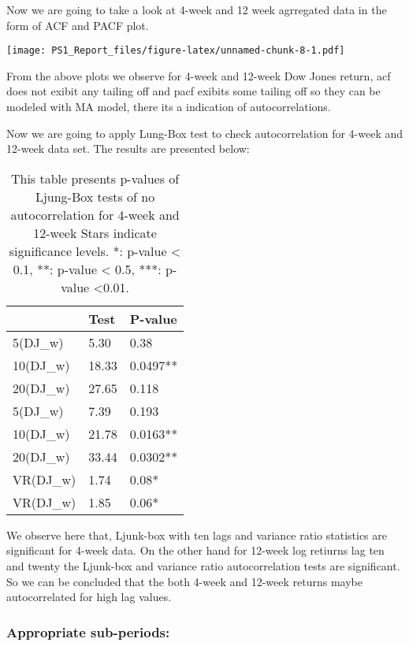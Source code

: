 \documentclass[
]{article}
\begin{document}
Now we are going to take a look at 4-week and 12 week agrregated data in
the form of ACF and PACF plot.

\texttt{[image: PS1\_Report\_files/figure-latex/unnamed-chunk-8-1.pdf]}

From the above plots we observe for 4-week and 12-week Dow Jones return,
acf does not exibit any tailing off and pacf exibits some tailing off so
they can be modeled with MA model, there its a indication of
autocorrelations.

Now we are going to apply Lung-Box test to check autocorrelation for
4-week and 12-week data set. The results are presented below:

\begin{table}

\caption{\label{tab:unnamed-chunk-9}This table presents p-values of Ljung-Box tests of no autocorrelation for 4-week and 12-week Stars indicate significance levels. *: p-value < 0.1, **: p-value < 0.5, ***: p-value <0.01.}
\centering
\begin{tabular}[t]{l|l|l}
\hline
  & Test & P-value\\
\hline
5(DJ\_w) & 5.30 & 0.38\\
\hline
10(DJ\_w) & 18.33 & 0.0497**\\
\hline
20(DJ\_w) & 27.65 & 0.118\\
\hline
5(DJ\_w) & 7.39 & 0.193\\
\hline
10(DJ\_w) & 21.78 & 0.0163**\\
\hline
20(DJ\_w) & 33.44 & 0.0302**\\
\hline
VR(DJ\_w) & 1.74 & 0.08*\\
\hline
VR(DJ\_w) & 1.85 & 0.06*\\
\hline
\end{tabular}
\end{table}

We observe here that, Ljunk-box with ten lags and variance ratio
statistics are significant for 4-week data. On the other hand for
12-week log retiurns lag ten and twenty the Ljunk-box and variance ratio
autocorrelation tests are significant. So we can be concluded that the
both 4-week and 12-week returns maybe autocorrelated for high lag
values.

\hypertarget{appropriate-sub-periods}{%
\subsubsection{Appropriate sub-periods:}\label{appropriate-sub-periods}}
\end{document}
